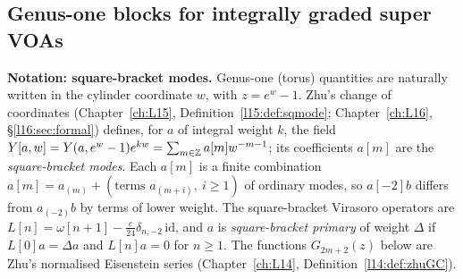 \subsection{Genus-one blocks for integrally graded super VOAs}

\textbf{Notation: square-bracket modes.} Genus-one (torus) quantities are naturally written in the
cylinder coordinate $w$, with $z=e^{w}-1$. Zhu's change of coordinates
(Chapter~\ref{ch:L15}, Definition~\ref{l15:def:sqmode}; Chapter~\ref{ch:L16}, §\ref{l16:sec:formal})
defines, for $a$ of integral weight $k$, the field $Y[a,w]=Y(a,e^{w}-1)e^{kw}=\sum_{m\in{\mathbb{Z}}}a[m]w^{-m-1}$;
its coefficients $a[m]$ are the \emph{square-bracket modes}. Each $a[m]$ is a finite combination
$a[m]=a_{(m)}+(\text{terms }a_{(m+i)},\ i\ge1)$ of ordinary modes, so $a[-2]b$ differs from $a_{(-2)}b$
by terms of lower weight. The square-bracket Virasoro operators are
$L[n]=\omega[n+1]-\frac c{24}\delta_{n,-2}\,\mathrm{id}$, and $a$ is \emph{square-bracket primary} of weight $\Delta$
if $L[0]a=\Delta a$ and $L[n]a=0$ for $n\ge1$. The functions $G_{2m+2}(z)$ below are Zhu's normalised
Eisenstein series (Chapter~\ref{ch:L14}, Definition~\ref{l14:def:zhuGC}).

